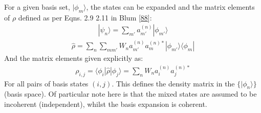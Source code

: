 \documentclass[letterpaper,table,10pt,english]{jupyterBook}
\begin{document}
\sphinxAtStartPar
For a given basis set, \(|\phi_{m}\rangle\), the states can be expanded and the matrix elements of \(\rho\) defined as per Eqns. 2.9 \sphinxhyphen{} 2.11 in Blum {[}\hyperlink{cite.backmatter/bibliography:id525}{88}{]}:
\begin{equation*}
\begin{split}
| \psi_{n} \rangle = \sum_{m'} a_{m'}^{(n)}| \phi_{m'}\rangle
\end{split}
\end{equation*}\begin{equation}\label{equation:part1/theory_density_matrices_190723:eqn:density-mat-outer-prod}
\begin{split}
\hat{\rho}=\sum_{n}\sum_{mm'}W_{n}a_{m'}^{(n)}a_{m}^{(n)*}|\phi_{m'}\rangle\langle\phi_{m}|
\end{split}
\end{equation}
\sphinxAtStartPar
And the matrix elements \sphinxhyphen{}  \sphinxhyphen{} given explicitly as:
\begin{equation}\label{equation:part1/theory_density_matrices_190723:eqn:density-mat-generic}
\begin{split}
\rho_{i,j}=\langle\phi_{i}|\hat{\rho}|\phi_{j}\rangle=\sum_{n}W_{n}a_{i}^{(n)}a_{j}^{(n)*}
\end{split}
\end{equation}
\sphinxAtStartPar
For all pairs of basis states \((i,j)\). This defines the density matrix in the \(\{|\phi_n\rangle\}\)  (basis space). Of particular note here is that the mixed states are assumed to be incoherent (independent), whilst the basis expansion is coherent.
\end{document}
